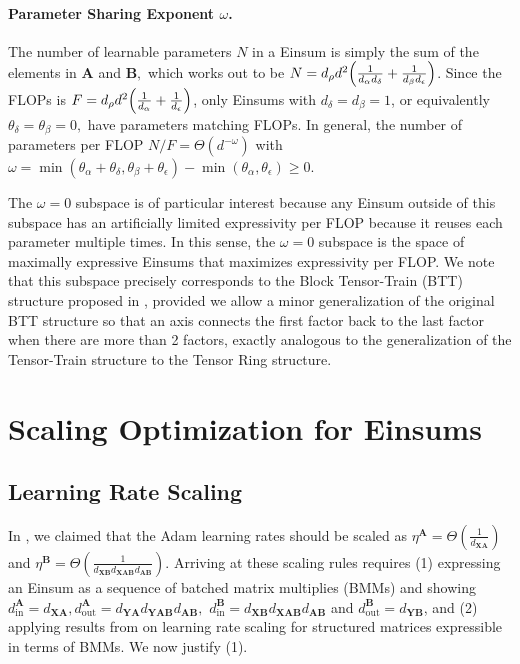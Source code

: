 \documentclass{article}
\newcommand{\mbf}[1]{{\boldsymbol{\mathbf{#1}}}}
\newcommand{\bm}{\mbf}
\begin{document}
\paragraph{Parameter Sharing Exponent $\omega$.}
The number of learnable parameters $N$ in a Einsum is simply the sum of the elements in $\bm{A}$ and $\bm{B},$ which works out to be
$N  =d_{\rho} d^{2} \qty(\frac{1}{d_{\alpha} d_{\delta}} + \frac{1}{d_{\beta} d_{\epsilon}})$.
Since the FLOPs is $F = d_{\rho} d^2 \qty(\frac{1}{d_{\alpha}} + \frac{1}{d_{\epsilon}})$, only Einsums with $d_\delta = d_\beta = 1$,
or equivalently $\theta_\delta = \theta_\beta = 0,$ have parameters matching FLOPs.
In general, the number of parameters per FLOP $N / F = \Theta(d^{-\omega})$ with $\omega = \min(\theta_\alpha + \theta_\delta, \theta_\beta + \theta_\epsilon) - \min(\theta_\alpha, \theta_\epsilon) \geq 0.$

The $\omega = 0$ subspace is of particular interest because any Einsum outside of this subspace has an artificially limited expressivity per FLOP because it reuses each parameter multiple times. In this sense, the $\omega = 0$ subspace is the space of maximally expressive Einsums that maximizes expressivity per FLOP. We note that this subspace precisely corresponds to the Block Tensor-Train (BTT) structure proposed in \citet{qiu2024compute}, provided we allow a minor generalization of the original BTT structure so that an axis connects the first factor back to the last factor when there are more than 2 factors, exactly analogous to the generalization of the Tensor-Train structure to the Tensor Ring \citep{zhao2016tensor} structure.

\section{Scaling Optimization for Einsums} \label{app:muP}
\subsection{Learning Rate Scaling} \label{app:lr_scale}
In , we claimed that the Adam learning rates should be scaled as $\eta^{\bm{A}} = \Theta(\frac{1}{d_{\bm{X} \bm{A}}})$ and $\eta^{\bm{B}} = \Theta(\frac{1}{d_{\bm{X} \bm{B}} d_{\bm{X} \bm{A} \bm{B}} d_{\bm{A} \bm{B}}})$. Arriving at these scaling rules requires (1) expressing an Einsum as a sequence of batched matrix multiplies (BMMs) and showing $d_{\text{in}}^{\bm{A}} = d_{\bm{X}\bm{A}},
d_{\text{out}}^{\bm{A}} = d_{\bm{Y}\bm{A}} d_{\bm{Y} \bm{A} \bm{B}} d_{\bm{A}\bm{B}},$
$d_{\text{in}}^{\bm{B}} = d_{\bm{X} \bm{B}} d_{\bm{X} \bm{A} \bm{B}} d_{\bm{A} \bm{B}}$
and $d_{\text{out}}^{\bm{B}} = d_{\bm{Y}\bm{B}}$, and (2) applying results from \citet{qiu2024compute} on learning rate scaling for structured matrices expressible in terms of BMMs. We now justify (1).
\end{document}
